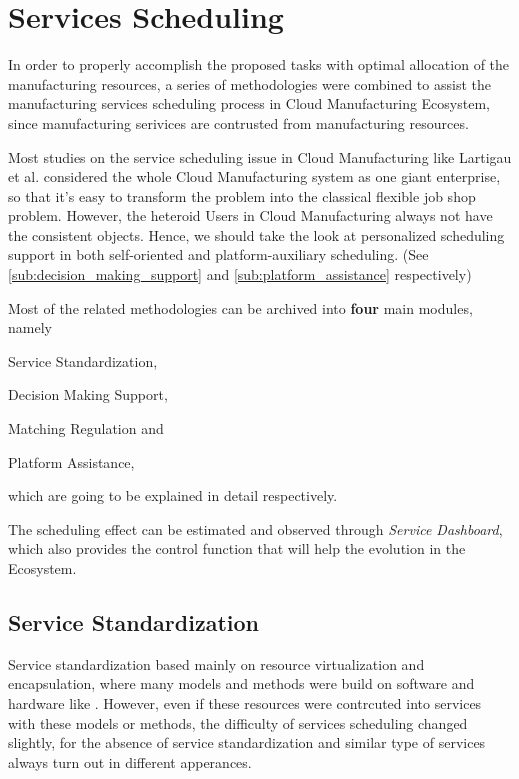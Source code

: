 \section{Services Scheduling} %
\label{sec:schedule}

In order to properly accomplish the proposed tasks with optimal allocation of the manufacturing resources, a series of methodologies were combined to assist the manufacturing services scheduling process in Cloud Manufacturing Ecosystem, since manufacturing serivices are contrusted from manufacturing resources. 

Most studies on the service scheduling issue in Cloud Manufacturing like Lartigau et al.\cite{Lartigau2012} considered the whole Cloud Manufacturing system as one giant enterprise, so that it's easy to transform the problem into the classical flexible job shop problem. However, the heteroid Users in Cloud Manufacturing always not have the consistent objects. Hence, we should take the look at personalized scheduling support in both self-oriented and platform-auxiliary scheduling. (See \autoref{sub:decision_making_support} and \ref{sub:platform_assistance} respectively)

Most of the related methodologies can be archived into \textbf{four} main modules, namely
\begin{inparaenum}[1)]
\item Service Standardization,
\item Decision Making Support,
\item Matching Regulation and
\item Platform Assistance,
\end{inparaenum} which are going to be explained in detail respectively.

The scheduling effect can be estimated and observed through \textit{Service Dashboard}, which also provides the control function that will help the evolution in the Ecosystem.

\subsection{Service Standardization} %
\label{sub:service_standardization}
Service standardization based mainly on  resource virtualization and encapsulation, where many models and methods were build on software and hardware like \cite{Li2011,Wu2011,Li2011a,Liu2011}. However, even if these resources were contrcuted into services with these models or methods, the difficulty of services scheduling changed slightly, for the absence of service standardization and similar type of services always turn out in different apperances.

